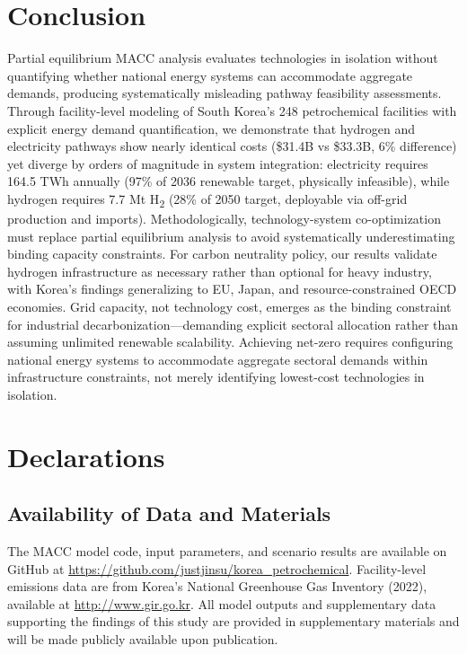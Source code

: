 \documentclass[11pt,a4paper]{article}
\begin{document}
\section{Conclusion}

Partial equilibrium MACC analysis evaluates technologies in isolation without quantifying whether national energy systems can accommodate aggregate demands, producing systematically misleading pathway feasibility assessments. Through facility-level modeling of South Korea's 248 petrochemical facilities with explicit energy demand quantification, we demonstrate that hydrogen and electricity pathways show nearly identical costs (\$31.4B vs \$33.3B, 6\% difference) yet diverge by orders of magnitude in system integration: electricity requires 164.5 TWh annually (97\% of 2036 renewable target, physically infeasible), while hydrogen requires 7.7 Mt H\textsubscript{2} (28\% of 2050 target, deployable via off-grid production and imports). Methodologically, technology-system co-optimization must replace partial equilibrium analysis to avoid systematically underestimating binding capacity constraints. For carbon neutrality policy, our results validate hydrogen infrastructure as necessary rather than optional for heavy industry, with Korea's findings generalizing to EU, Japan, and resource-constrained OECD economies. Grid capacity, not technology cost, emerges as the binding constraint for industrial decarbonization---demanding explicit sectoral allocation rather than assuming unlimited renewable scalability. Achieving net-zero requires configuring national energy systems to accommodate aggregate sectoral demands within infrastructure constraints, not merely identifying lowest-cost technologies in isolation.

\section*{Declarations}

\subsection*{Availability of Data and Materials}

The MACC model code, input parameters, and scenario results are available on GitHub at \url{https://github.com/justjinsu/korea_petrochemical}. Facility-level emissions data are from Korea's National Greenhouse Gas Inventory (2022), available at \url{http://www.gir.go.kr}. All model outputs and supplementary data supporting the findings of this study are provided in supplementary materials and will be made publicly available upon publication.
\end{document}
